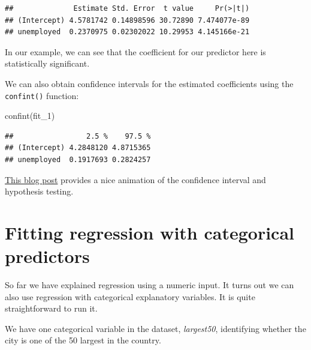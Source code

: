 \documentclass[
]{book}
\newenvironment{Shaded}{\begin{snugshade}}{\end{snugshade}}
\newcommand{\FunctionTok}[1]{\textcolor[rgb]{0.00,0.00,0.00}{#1}}
\newcommand{\NormalTok}[1]{#1}
\newcommand{\SpecialCharTok}[1]{\textcolor[rgb]{0.00,0.00,0.00}{#1}}
\begin{document}
\begin{Shaded}
\end{Shaded}

\begin{verbatim}
##              Estimate Std. Error  t value     Pr(>|t|)
## (Intercept) 4.5781742 0.14898596 30.72890 7.474077e-89
## unemployed  0.2370975 0.02302022 10.29953 4.145166e-21
\end{verbatim}

In our example, we can see that the coefficient for our predictor here is statistically significant.

We can also obtain confidence intervals for the estimated coefficients using the \texttt{confint()} function:

\begin{Shaded}
\begin{Highlighting}[]
\FunctionTok{confint}\NormalTok{(fit\_1)}
\end{Highlighting}
\end{Shaded}

\begin{verbatim}
##                 2.5 %    97.5 %
## (Intercept) 4.2848120 4.8715365
## unemployed  0.1917693 0.2824257
\end{verbatim}

\href{http://www.sumsar.net/blog/2013/12/an-animation-of-the-construction-of-a-confidence-interval/}{This blog post} provides a nice animation of the confidence interval and hypothesis testing.

\hypertarget{fitting-regression-with-categorical-predictors}{%
\section{Fitting regression with categorical predictors}\label{fitting-regression-with-categorical-predictors}}

So far we have explained regression using a numeric input. It turns out we can also use regression with categorical explanatory variables. It is quite straightforward to run it.

We have one categorical variable in the dataset, \emph{largest50}, identifying whether the city is one of the 50 largest in the country.

\begin{Shaded}
\end{Shaded}
\end{document}
